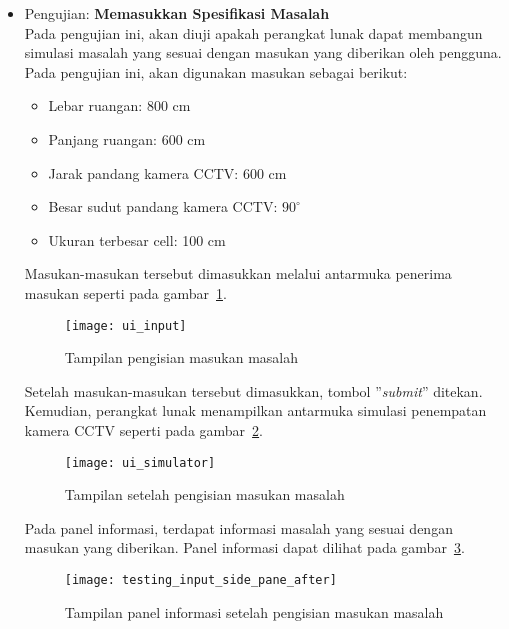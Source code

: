\begin{itemize}
	\item Pengujian: \textbf{Memasukkan Spesifikasi Masalah}\\
	Pada pengujian ini, akan diuji apakah perangkat lunak dapat membangun simulasi masalah yang sesuai dengan masukan yang diberikan oleh pengguna. Pada pengujian ini, akan digunakan masukan sebagai berikut:	
	
	\begin{itemize}
		\item Lebar ruangan: 800 cm
		\item Panjang ruangan: 600 cm
		\item Jarak pandang kamera CCTV: 600 cm
		\item Besar sudut pandang kamera CCTV: \(90^\circ\)
		\item Ukuran terbesar cell: 100 cm
	\end{itemize}

	Masukan-masukan tersebut dimasukkan melalui antarmuka penerima masukan seperti pada gambar~\ref{fig:testing_input_before}.
	
	\begin{figure}[H]
		\centering  
		\texttt{[image: ui\_input]}
		\caption[Tampilan pengisian masukan masalah]{Tampilan pengisian masukan masalah}
		\label{fig:testing_input_before}
	\end{figure}
	
	Setelah masukan-masukan tersebut dimasukkan, tombol ''\textit{submit}'' ditekan. Kemudian, perangkat lunak menampilkan antarmuka simulasi penempatan kamera CCTV seperti pada gambar~\ref{fig:testing_input_after}. 
	
	\begin{figure}[H]
		\centering  
		\texttt{[image: ui\_simulator]}
		\caption[Tampilan setelah pengisian masukan masalah]{Tampilan setelah pengisian masukan masalah}
		\label{fig:testing_input_after}
	\end{figure}
	
	Pada panel informasi, terdapat informasi masalah yang sesuai dengan masukan yang diberikan. Panel informasi dapat dilihat pada gambar~\ref{fig:testing_input_side_pane_after}.
	
	\begin{figure}[H]
		\centering  
		\texttt{[image: testing\_input\_side\_pane\_after]}
		\caption[Tampilan panel informasi setelah pengisian masukan masalah]{Tampilan panel informasi setelah pengisian masukan masalah}
		\label{fig:testing_input_side_pane_after}
	\end{figure}	
	

\end{itemize}
